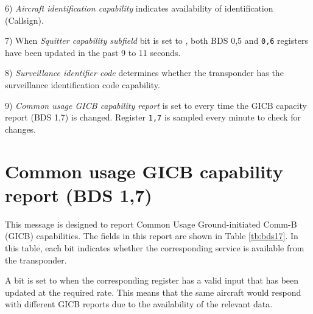 6) \emph{Aircraft identification capability} indicates availability of identification (Callsign).

7) When \emph{Squitter capability subfield} bit is set to \1, both BDS 0,5 and \texttt{0,6} registers have been updated in the past 9 to 11 seconds.

8) \emph{Surveillance identifier code} determines whether the transponder has the surveillance identification code capability.

9) \emph{Common usage GICB capability report} is set to \1 every time the GICB capacity report (BDS 1,7) is changed. Register \texttt{1,7} is sampled every minute to check for changes.

\section{Common usage GICB capability report (BDS 1,7)}

This message is designed to report Common Usage Ground-initiated Comm-B (GICB) capabilities. The fields in this report are shown in Table \ref{tb:bds17}. In this table, each bit indicates whether the corresponding service is available from the transponder. 

A bit is set to \1 when the corresponding register has a valid input that has been updated at the required rate. This means that the same aircraft would respond with different GICB reports due to the availability of the relevant data.

